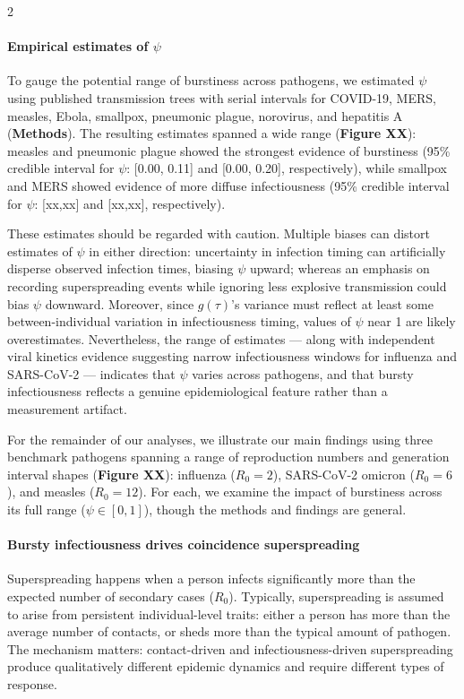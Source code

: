 \documentclass[10pt]{article}
\begin{document}
\begin{multicols}{2}
\paragraph{Empirical estimates of $\psi$} 

To gauge the potential range of burstiness across pathogens, we estimated $\psi$ using published transmission trees with serial intervals for COVID-19, MERS, measles, Ebola, smallpox, pneumonic plague, norovirus, and hepatitis A \citep{taube_open-access_2022} ({\bf Methods}). The resulting estimates spanned a wide range ({\bf Figure XX}): measles and pneumonic plague showed the strongest evidence of burstiness (95\% credible interval for $\psi$: [0.00, 0.11] and [0.00, 0.20], respectively), while smallpox and MERS showed evidence of more diffuse infectiousness (95\% credible interval for $\psi$: [xx,xx] and [xx,xx], respectively). 

These estimates should be regarded with caution. Multiple biases can distort estimates of $\psi$ in either direction: uncertainty in infection timing can artificially disperse observed infection times, biasing $\psi$ upward; whereas an emphasis on recording superspreading events while ignoring less explosive transmission could bias $\psi$ downward. Moreover, since $g(\tau)$'s variance must reflect at least some between-individual variation in infectiousness timing, values of $\psi$ near 1 are likely overestimates. Nevertheless, the range of estimates --- along with independent viral kinetics evidence suggesting narrow infectiousness windows for influenza and SARS-CoV-2 \citep{goyal_viral_2021} --- indicates that $\psi$ varies across pathogens, and that bursty infectiousness reflects a genuine epidemiological feature rather than a measurement artifact. 

For the remainder of our analyses, we illustrate our main findings using three benchmark pathogens spanning a range of reproduction numbers and generation interval shapes ({\bf Figure XX}): influenza ($R_0 = 2$), SARS-CoV-2 omicron ($R_0 = 6$), and measles ($R_0 = 12$). For each, we examine the impact of burstiness across its full range ($\psi \in [0,1]$), though the methods and findings are general. 

\paragraph{Bursty infectiousness drives coincidence superspreading} Superspreading happens when a person infects significantly more than the expected number of secondary cases ($R_0$). Typically, superspreading is assumed to arise from persistent individual-level traits: either a person has more than the average number of contacts, or sheds more than the typical amount of pathogen. The mechanism matters: contact-driven and infectiousness-driven superspreading produce qualitatively different epidemic dynamics and require different types of response.\citep{kuylen_different_2022} 


\end{multicols}
\end{document}
